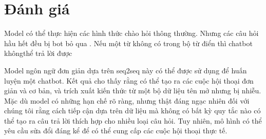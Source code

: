 \section{Đánh giá}
Model có thể thực hiện các hình thức chào hỏi thông thường. Nhưng các câu hỏi hầu hết đều bị bot bỏ qua . Nếu một
từ không có trong bộ từ điển thì chatbot khôngthể trả lời được

Model ngôn ngữ đơn giản dựa trên seq2seq này có thể được sử dụng để huấn luyện một chatbot. Kết
quả cho thấy rằng có thể tạo ra các cuộc hội thoại đơn giản và cơ bản, và trích xuất kiến thức từ một bộ dữ liệu tên
mở nhưng bị nhiễu. Mặc dù model có những hạn chế rõ ràng, nhưng thật đáng ngạc nhiên đối với chúng tôi rằng cách
tiếp cận dựa trên dữ liệu mà không có bất kỳ quy tắc nào có thể tạo ra câu trả lời thích hợp cho nhiều loại câu hỏi.
Tuy nhiên, mô hình có thể yêu cầu sửa đổi đáng kể để có thể cung cấp các cuộc hội thoại thực tế.